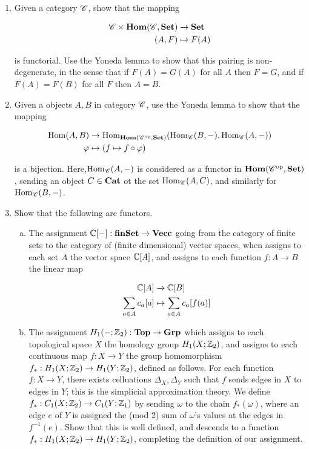 \documentclass{article}
\theoremstyle{definition}
\numberwithin{figure}{section}
\begin{document}
\begin{enumerate}[\thesection .1.]
\item Given a category $\mathscr{C}$, show that the mapping

\begin{align*}
\mathscr{C} \times \bold{Hom}(\mathscr{C},\bold{Set})&\to\bold{Set}\\
(A,F)&\mapsto F(A)
\end{align*}

is functorial. Use the Yoneda lemma to show that this pairing is non-degenerate, in the sense that if $F(A)=G(A)$ for all $A$ then $F=G$, and if $F(A)=F(B)$ for all $F$ then $A=B$.

\item Given a objects $A,B$ in category $\mathscr{C}$, use the Yoneda lemma to show that the mapping

\begin{align*}
\mathrm{Hom}(A,B)&\to \mathrm{Hom}_{\bold{Hom}(\mathscr{C}^{\mathrm{op}},\bold{Set})}(\mathrm{Hom}_{\mathscr{C}}(B,\--),\mathrm{Hom}_{\mathscr{C}}(A,\--))\\
\varphi & \mapsto  \left(f\mapsto f\circ \varphi\right)
\end{align*}

is a bijection. Here,$\mathrm{Hom}_{\mathscr{C}}(A,\--)$ is considered as a functor in $\bold{Hom}(\mathscr{C}^{\mathrm{op}},\bold{Set})$, sending an object $C\in \bold{Cat}$ ot the set $\mathrm{Hom}_{\mathscr{C}}(A,C)$, and similarly for $\mathrm{Hom}_{\mathscr{C}}(B,\--)$.

\item Show that the following are functors.

\begin{enumerate}[(a)]
\item The assignment $\mathbb{C}[\--]:\bold{finSet}\to\bold{Vecc}$ going from the category of finite sets to the category of (finite dimensional) vector spaces, when assigns to each set $A$ the vector space $\mathbb{C}[A]$, and assigns to each function $f:A\to B$ the linear map

\begin{align*}
\mathbb{C}[A]&\xrightarrow{} \mathbb{C}[B]\\
\sum_{a\in A}c_a [a]&\mapsto \sum_{a\in A}c_a[f(a)]
\end{align*}

\item The assignment $H_1(\--;\mathbb{Z}_2):\bold{Top}\to \bold{Grp}$ which assigns to each topological space $X$ the homology group $H_1(X;\mathbb{Z}_2)$, and assigns to each continuous map $f:X\to Y$ the group homomorphism $f_*: H_1(X;\mathbb{Z}_2)\to H_1(Y;\mathbb{Z}_2)$, defined as follows. For each function $f:X\to Y$, there exists celluations $\Delta_X,\Delta_Y$ such that $f$ sends edges in $X$ to edges in $Y$; this is the simplicial approximation theory. We define $f_*:C_1(X;\mathbb{Z}_2)\to C_1(Y;\mathbb{Z}_1)$ by sending $\omega$ to the chain $f_*(\omega)$, where  an edge $e$ of $Y$ is assigned the (mod 2) sum of $\omega$'s values at the edges in $f^{-1}(e)$. Show that this is well defined, and descends to a function $f_*:H_1(X;\mathbb{Z}_2)\to H_1(Y;\mathbb{Z}_2)$, completing the definition of our assignment.
\end{enumerate}


\end{enumerate}
\end{document}
